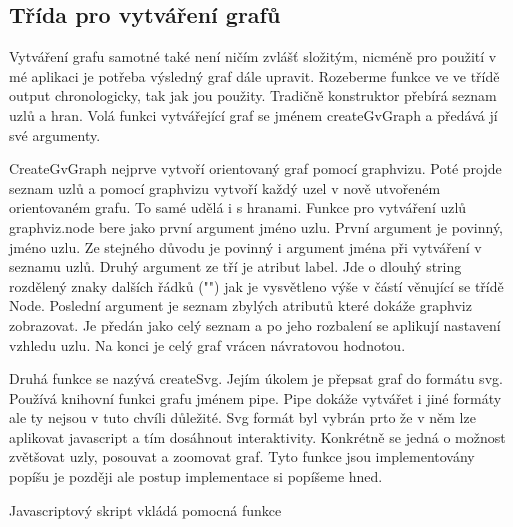 \documentclass[color,table,oneside,nolot,nolof]{fithesis}
\begin{document}
\subsection{Třída pro vytváření grafů}
	Vytváření grafu samotné také není ničím zvlášť složitým, nicméně pro použití v mé aplikaci je potřeba výsledný graf dále upravit. Rozeberme funkce ve ve třídě output chronologicky,
	tak jak jou použity. Tradičně konstruktor přebírá seznam uzlů a hran. Volá funkci vytvářející graf se jménem createGvGraph a předává jí své argumenty. 

	CreateGvGraph nejprve vytvoří orientovaný graf pomocí graphvizu. Poté projde seznam uzlů a pomocí graphvizu vytvoří každý uzel v nově utvořeném orientovaném grafu. To samé udělá i
	s hranami. Funkce pro vytváření uzlů graphviz.node bere jako první argument jméno uzlu. První argument je povinný, jméno uzlu. Ze stejného důvodu je povinný i argument jména
	při vytváření v seznamu uzlů. Druhý argument ze tří je atribut label. Jde o dlouhý string rozdělený znaky dalších řádků ("\n") jak je vysvětleno výše v částí věnující se třídě Node.
	Poslední argument je seznam zbylých atributů které dokáže graphviz zobrazovat. Je předán jako celý seznam a po jeho rozbalení se aplikují nastavení vzhledu uzlu. Na konci je celý
	graf vrácen návratovou hodnotou.

	Druhá funkce se nazývá createSvg. Jejím úkolem je přepsat graf do formátu svg. Používá knihovní funkci grafu jménem pipe. Pipe dokáže vytvářet i jiné formáty ale ty nejsou v tuto
	chvíli důležité. Svg formát byl vybrán prto že v něm lze aplikovat javascript a tím dosáhnout interaktivity. Konkrétně se jedná o možnost zvětšovat uzly, posouvat a zoomovat graf.
	Tyto funkce jsou implementovány popíšu je později ale postup implementace si popíšeme hned.

	Javascriptový skript vkládá pomocná funkce 
	

	\printbibliography
\end{document}
